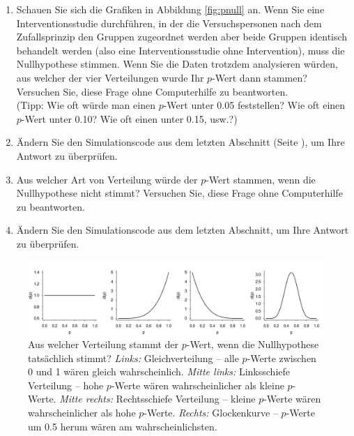 \documentclass[oneside, 10pt]{book}\usepackage[]{graphicx}\usepackage[]{xcolor}
\newenvironment{knitrout}{}{} %
\begin{document}
\begin{enumerate}
 \item Schauen Sie sich die Grafiken in Abbildung \ref{fig:pnull} an.
 Wenn Sie eine Interventionsstudie durchführen, in der die Versuchspersonen nach dem Zufallsprinzip den Gruppen zugeordnet werden aber beide Gruppen identisch behandelt werden (also eine Interventionsstudie ohne Intervention), muss die Nullhypothese stimmen. Wenn Sie die Daten trotzdem analysieren würden, aus welcher der vier Verteilungen wurde Ihr $p$-Wert dann stammen? Versuchen Sie, diese Frage ohne Computerhilfe zu beantworten.\\
 (Tipp: Wie oft würde man einen $p$-Wert unter 0.05 feststellen? Wie oft einen $p$-Wert unter 0.10? Wie oft einen unter 0.15, usw.?)
 \item Ändern Sie den Simulationscode aus dem letzten Abschnitt
 (Seite \pageref{code:tdistribution}), um Ihre Antwort zu überprüfen.
 \item Aus welcher Art von Verteilung würde der $p$-Wert stammen, wenn die Nullhypothese nicht stimmt?
 Versuchen Sie, diese Frage ohne Computerhilfe zu beantworten.
 \item Ändern Sie den Simulationscode aus dem letzten Abschnitt, um Ihre Antwort zu überprüfen.
\end{enumerate}

\begin{knitrout}
\color{fgcolor}\begin{figure}[tp]

{\centering \includegraphics[width=\textwidth]{figs/unnamed-chunk-373-1} 

}

\caption{Aus welcher Verteilung stammt der $p$-Wert, wenn die Nullhypothese tatsächlich stimmt? \textit{Links:} Gleichverteilung -- alle $p$-Werte zwischen 0 und 1 wären gleich wahrscheinlich. \textit{Mitte links:} Linksschiefe Verteilung -- hohe $p$-Werte wären wahrscheinlicher als kleine $p$-Werte. \textit{Mitte rechts:} Rechtsschiefe Verteilung -- kleine $p$-Werte wären wahrscheinlicher als hohe $p$-Werte. \textit{Rechts:} Glockenkurve -- $p$-Werte um 0.5 herum wären am wahrscheinlichsten.\label{fig:pnull}}\label{fig:unnamed-chunk-373}
\end{figure}

\end{knitrout}
\end{document}
